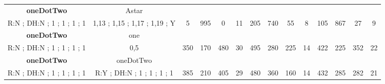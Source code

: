 \begin{table}[H]
{\begin{tabular}{|c|c|c|c|c|c|c|c|c|c|c|c|c|c|}
\cellcolor{blue!15}\textbf{oneDotTwo} & Astar& {\color[HTML]{00009B} } & {\color[HTML]{9A0000} } & {\color[HTML]{009901} } &  & {\color[HTML]{00009B} } & {\color[HTML]{9A0000} } & {\color[HTML]{009901} } &  & {\color[HTML]{00009B} } & {\color[HTML]{9A0000} } & {\color[HTML]{009901} } &  \\ 
\cellcolor{ blue!15}R:N ; DH:N ; 1 ; 1 ; 1 ; 1 & 1,13 ; 1,15 ; 1,17 ; 1,19 ; Y & \multirow{-2}{*}{{\color[HTML]{00009B} 5}} & \multirow{-2}{*}{{\color[HTML]{9A0000} 995}} & \multirow{-2}{*}{{\color[HTML]{009901} 0}} & \multirow{-2}{*}{11} & \multirow{-2}{*}{{\color[HTML]{00009B} 205}} & \multirow{-2}{*}{{\color[HTML]{9A0000} 740}} & \multirow{-2}{*}{{\color[HTML]{009901} 55}} & \multirow{-2}{*}{8} & \multirow{-2}{*}{{\color[HTML]{00009B} 105}} & \multirow{-2}{*}{{\color[HTML]{9A0000} 867}} & \multirow{-2}{*}{{\color[HTML]{009901} 27}} & \multirow{-2}{*}{9} \\ \hline

\cellcolor{blue!15}\textbf{oneDotTwo} & one& {\color[HTML]{00009B} } & {\color[HTML]{9A0000} } & {\color[HTML]{009901} } &  & {\color[HTML]{00009B} } & {\color[HTML]{9A0000} } & {\color[HTML]{009901} } &  & {\color[HTML]{00009B} } & {\color[HTML]{9A0000} } & {\color[HTML]{009901} } &  \\ 
\cellcolor{ blue!15}R:N ; DH:N ; 1 ; 1 ; 1 ; 1 & 0,5 & \multirow{-2}{*}{{\color[HTML]{00009B} 350}} & \multirow{-2}{*}{{\color[HTML]{9A0000} 170}} & \multirow{-2}{*}{{\color[HTML]{009901} 480}} & \multirow{-2}{*}{30} & \multirow{-2}{*}{{\color[HTML]{00009B} 495}} & \multirow{-2}{*}{{\color[HTML]{9A0000} 280}} & \multirow{-2}{*}{{\color[HTML]{009901} 225}} & \multirow{-2}{*}{14} & \multirow{-2}{*}{{\color[HTML]{00009B} 422}} & \multirow{-2}{*}{{\color[HTML]{9A0000} 225}} & \multirow{-2}{*}{{\color[HTML]{009901} 352}} & \multirow{-2}{*}{22} \\ \hline

\cellcolor{blue!15}\textbf{oneDotTwo} & oneDotTwo& {\color[HTML]{00009B} } & {\color[HTML]{9A0000} } & {\color[HTML]{009901} } &  & {\color[HTML]{00009B} } & {\color[HTML]{9A0000} } & {\color[HTML]{009901} } &  & {\color[HTML]{00009B} } & {\color[HTML]{9A0000} } & {\color[HTML]{009901} } &  \\ 
\cellcolor{ blue!15}R:N ; DH:N ; 1 ; 1 ; 1 ; 1 & R:Y ; DH:N ; 1 ; 1 ; 1 ; 1 & \multirow{-2}{*}{{\color[HTML]{00009B} 385}} & \multirow{-2}{*}{{\color[HTML]{9A0000} 210}} & \multirow{-2}{*}{{\color[HTML]{009901} 405}} & \multirow{-2}{*}{29} & \multirow{-2}{*}{{\color[HTML]{00009B} 480}} & \multirow{-2}{*}{{\color[HTML]{9A0000} 360}} & \multirow{-2}{*}{{\color[HTML]{009901} 160}} & \multirow{-2}{*}{14} & \multirow{-2}{*}{{\color[HTML]{00009B} 432}} & \multirow{-2}{*}{{\color[HTML]{9A0000} 285}} & \multirow{-2}{*}{{\color[HTML]{009901} 282}} & \multirow{-2}{*}{21} \\ \hline


\end{tabular}}
\end{table}

